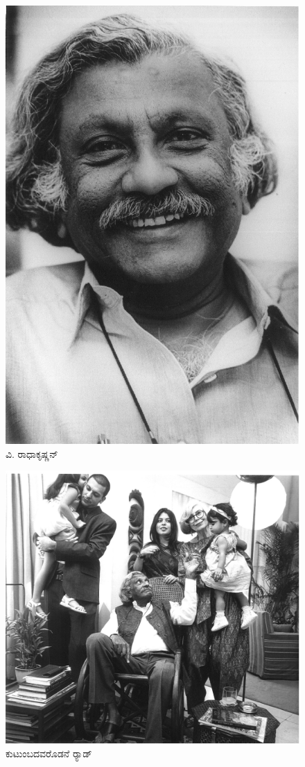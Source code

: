 \begin{figure}
\includegraphics{"images/18.jpg"}
\caption{ವಿ. ರಾಧಾಕೃಷ್ಣನ್}
\end{figure}


\begin{figure}
\includegraphics{"images/19.jpg"}
\caption{ಕುಟುಂಬದವರೊಡನೆ ರ‍್ಯಾಡ್}
\end{figure}


